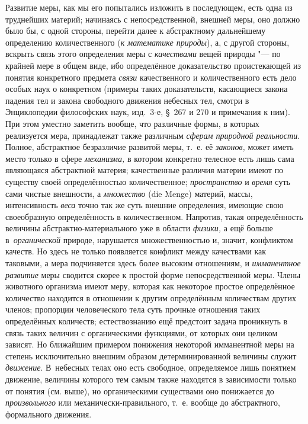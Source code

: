 Развитие меры, как мы его попытались изложить в последующем, есть одна из
труднейших материй; начинаясь с непосредственной, внешней меры, оно должно было
бы, с одной стороны, перейти далее к абстрактному дальнейшему определению
количественного ({\em к математике природы}), а, с другой стороны, вскрыть
связь этого определения меры с {\em качествами} вещей природы "--- по крайней
мере в общем виде, ибо определённое доказательство проистекающей из понятия
конкретного предмета {\em связи} качественного и количественного есть дело
особых наук о конкретном (примеры таких доказательств, касающиеся закона
падения тел и закона свободного движения небесных тел, смотри в Энциклопедии
философских наук, изд.~3-е, \S~267 и 270 и примечания к ним). При этом уместно
заметить вообще, что различные формы, в которых реализуется мера, принадлежат
также различным {\em сферам природной реальности}. Полное, абстрактное
безразличие развитой меры, т.~е. её {\em законов,} может иметь место только в
сфере {\em механизма,} в котором конкретно телесное есть лишь сама являющаяся
абстрактной материя; качественные различия материи имеют по существу своей
определённостью количественное; {\em пространство} и {\em время} суть сами
чистые внешности, а {\em множество} (die Menge) материй, массы, интенсивность
{\em веса} точно так же суть внешние определения, имеющие свою своеобразную
определённость в количественном. Напротив, такая определённость величины
абстрактно-материального уже в области {\em физики,} а ещё больше
в~{\em органической} природе, нарушается множественностью и, значит, конфликтом
качеств. Но здесь не только появляется конфликт между качествами как таковыми,
а мера подчиняется здесь более высоким отношениям, и {\em имманентное развитие}
меры сводится скорее к простой форме непосредственной меры. Члены животного
организма имеют меру, которая как некоторое простое определённое количество
находится в отношении к другим определённым количествам других членов;
пропорции человеческого тела суть прочные отношения таких определённых
количеств; естествознанию ещё предстоит задача проникнуть в связь таких величин
с органическими функциями, от которых они целиком зависят. Но ближайшим
примером понижения некоторой имманентной меры на степень исключительно внешним
образом детерминированной величины служит {\em движение}. В~небесных телах оно
есть свободное, определяемое лишь понятием движение, величины которого тем
самым также находятся в зависимости только от понятия (см. выше), но
органическими существами оно понижается до {\em произвольного} или
механически-правильного, т.~е. вообще до абстрактного, формального движения.

